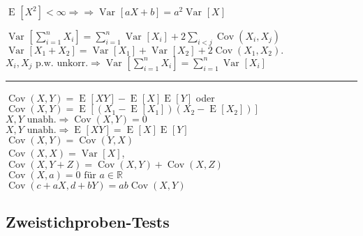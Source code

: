 \documentclass[a4paper, 12pt]{extarticle}
\newcommand{\sep}{\vspace{5pt}\noindent\hrule\vspace{5pt}}
\newcommand{\R}{\mathbb{R}}
\newcommand{\Var}[2][]{\operatorname{Var}_{#1}\left[ #2 \right]}
\newcommand{\Exp}[2][]{\operatorname{E}_{#1}\left[ #2 \right]}
\newcommand{\Cov}[1]{\operatorname{Cov}\left(#1 \right)}
\begin{document}
\begin{multicols*}{2}
$\Exp{X^2}<\infty\Rightarrow\Rightarrow\Var{aX+b}=a^2\Var{X}$

$
\Var{\sum_{i=1}^n X_i} = 
\sum_{i=1}^n \Var{X_i} + 2\sum_{i<j} \Cov{X_i,X_j}
$\\
$\Var{X_1+X_2} = \Var{X_1} + \Var{X_2} + 2\Cov{X_1,X_2}.$\\
$
X_i,X_j\text{ p.w. unkorr.}\Rightarrow
\Var{\sum_{i=1}^n X_i} = \sum_{i=1}^n\Var{X_i}
$

\sep

$\Cov{X,Y}=\Exp{XY}-\Exp{X}\Exp{Y}$ oder\\
$\Cov{X,Y}=\Exp{(X_1-\Exp{X_1})(X_2-\Exp{X_2})}$\\
$X,Y \text{ unabh.}\Longrightarrow \Cov{X,Y}=0$\\
$X,Y \text{ unabh.}\Longrightarrow \Exp{XY}=\Exp{X}\Exp{Y}$\\
$\Cov{X,Y}=\Cov{Y,X}$\\
$\Cov{X,X}=\Var{X}$,\\
$\Cov{X,Y+Z}=\Cov{X,Y}+\Cov{X,Z}$\\
$\Cov{X,a}=0 \text{ für }a\in\R$\\
$\Cov{c+aX,d+bY}=ab\Cov{X,Y}$

\end{multicols*}

\subsection{Zweistichproben-Tests}
\end{document}
